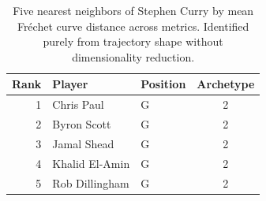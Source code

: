 \begin{table}[htbp]
  \centering\small
  \begin{tabular}{rllc}
    \toprule
    Rank & Player & Position & Archetype \\
    \midrule
    1 & Chris Paul & G & 2 \\
    2 & Byron Scott & G & 2 \\
    3 & Jamal Shead & G & 2 \\
    4 & Khalid El-Amin & G & 2 \\
    5 & Rob Dillingham & G & 2 \\
    \bottomrule
  \end{tabular}
  \caption{Five nearest neighbors of Stephen Curry by mean Fr\'{e}chet curve distance across metrics. Identified purely from trajectory shape without dimensionality reduction.}
  \label{tab:Stephen_Curry_frechet_curve_neighbors}
\end{table}

